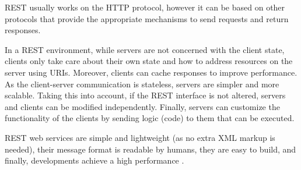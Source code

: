 \documentclass[final,1p,times]{elsarticle}
\begin{document}
REST usually works on the HTTP protocol, however it can be based on other protocols that provide the appropriate mechanisms to send requests and return responses.



In a REST environment, while servers are not concerned with the client state, clients only take care about their own state and how to address resources on the server using URIs. Moreover, clients can cache responses to improve performance.
As the client-server communication is stateless, servers are simpler and more scalable. 
Taking this into account, if the REST interface is not altered, servers and clients can be modified independently.
Finally, servers can customize the functionality of the clients by sending logic (code) to them that can be executed.


REST web services are simple and lightweight (as no extra XML markup is needed), their message format is readable by humans, they are easy to build, and finally, developments achieve a high performance \cite{Daigneau2011}.
\end{document}
